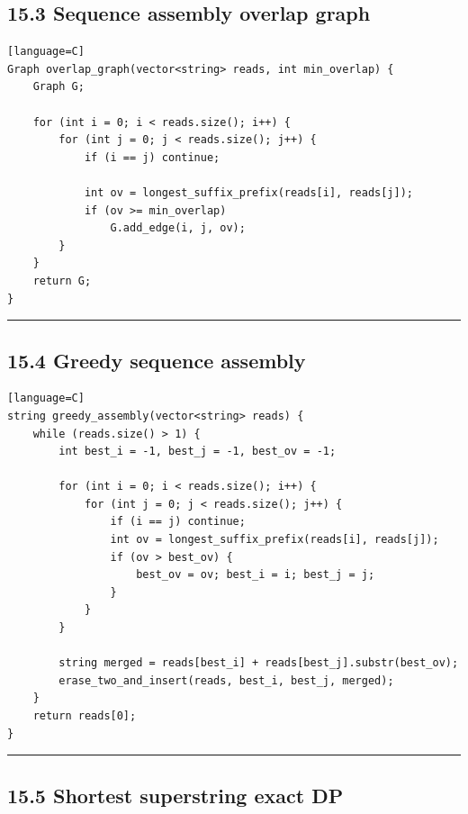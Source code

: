 \documentclass[11pt]{article}
\begin{document}
\subsection{15.3 Sequence assembly overlap graph}\label{sequence-assembly-overlap-graph}

\begin{verbatim}[language=C]
Graph overlap_graph(vector<string> reads, int min_overlap) {
    Graph G;

    for (int i = 0; i < reads.size(); i++) {
        for (int j = 0; j < reads.size(); j++) {
            if (i == j) continue;

            int ov = longest_suffix_prefix(reads[i], reads[j]);
            if (ov >= min_overlap)
                G.add_edge(i, j, ov);
        }
    }
    return G;
}
\end{verbatim}

\begin{center}\rule{0.5\linewidth}{0.5pt}\end{center}

\subsection{15.4 Greedy sequence assembly}\label{greedy-sequence-assembly}

\begin{verbatim}[language=C]
string greedy_assembly(vector<string> reads) {
    while (reads.size() > 1) {
        int best_i = -1, best_j = -1, best_ov = -1;

        for (int i = 0; i < reads.size(); i++) {
            for (int j = 0; j < reads.size(); j++) {
                if (i == j) continue;
                int ov = longest_suffix_prefix(reads[i], reads[j]);
                if (ov > best_ov) {
                    best_ov = ov; best_i = i; best_j = j;
                }
            }
        }

        string merged = reads[best_i] + reads[best_j].substr(best_ov);
        erase_two_and_insert(reads, best_i, best_j, merged);
    }
    return reads[0];
}
\end{verbatim}

\begin{center}\rule{0.5\linewidth}{0.5pt}\end{center}

\subsection{15.5 Shortest superstring exact DP}\label{shortest-superstring-exact-dp}
\end{document}
